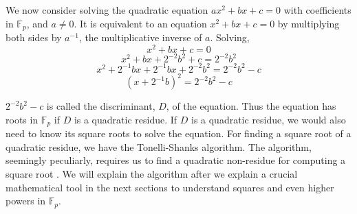 \documentclass{report}
\newcommand{\ignore}[1]{}
\begin{document}
We now consider solving the quadratic equation $ax^2+bx+c=0$ with coefficients in $\mathbb{F}_p$, and $a\neq 0$. It is equivalent to an equation $x^2+bx+c=0$ by multiplying both sides by $a^{-1}$, the multiplicative inverse of $a$. Solving,
$$x^2+bx+c=0$$
$$x^2+bx+2^{-2}b^{2}+c=2^{-2}b^{2}$$
$$x^2+2^{-1}bx+2^{-1}bx+2^{-2}b^{2}=2^{-2}b^{2}-c$$
$$(x+2^{-1}b)^2=2^{-2}b^{2}-c$$

$2^{-2}b^{2}-c$ is called the discriminant, $D$, of the equation. Thus the equation has roots in $\mathbb{F}_p$ if $D$ is a quadratic residue. If $D$ is a quadratic residue, we would also need to know its square roots to solve the equation. For finding a square root of a quadratic residue, we have the Tonelli-Shanks algorithm. The algorithm, seemingly peculiarly, requires us to find a quadratic non-residue for computing a square root \ignore{find probabilistically. The existing efficient algorithms for finding a quadratic non-residue are all probabilistic}. We will explain the algorithm after we explain a crucial mathematical tool in the next sections to understand squares and even higher powers in $\mathbb{F}_p$.
\end{document}
